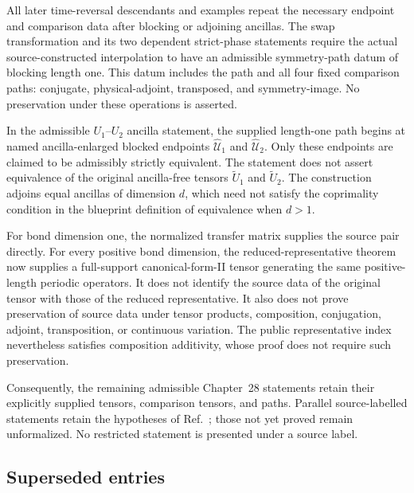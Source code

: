 \documentclass{article}
\begin{document}
All later time-reversal descendants and examples repeat the necessary endpoint
and comparison data after blocking or adjoining ancillas. The swap
transformation and its two dependent strict-phase statements require the
actual source-constructed interpolation to have an admissible symmetry-path
datum of blocking length one. This datum includes the path and all four fixed
comparison paths: conjugate, physical-adjoint, transposed, and symmetry-image.
No preservation under these operations is asserted.

In the admissible $U_1$--$U_2$ ancilla statement, the supplied length-one path
begins at named ancilla-enlarged blocked endpoints
$\widehat{\mathcal U}_1$ and $\widehat{\mathcal U}_2$. Only these endpoints are
claimed to be admissibly strictly equivalent. The statement does not assert
equivalence of the original ancilla-free tensors $\widetilde U_1$ and
$\widetilde U_2$. The construction adjoins equal ancillas of dimension $d$,
which need not satisfy the coprimality condition in the blueprint definition
of equivalence when $d>1$.

For bond dimension one, the normalized transfer matrix supplies the source pair
directly. For every positive bond dimension, the reduced-representative theorem
now supplies a full-support canonical-form-II tensor generating the same
positive-length periodic operators. It does not identify the source data of the
original tensor with those of the reduced representative. It also does not
prove preservation of source data under tensor products, composition,
conjugation, adjoint, transposition, or continuous variation. The public
representative index nevertheless satisfies composition additivity, whose
proof does not require such preservation.

Consequently, the remaining admissible Chapter~28 statements retain their
explicitly supplied tensors, comparison tensors, and paths. Parallel
source-labelled statements retain the hypotheses of Ref.~\cite{Cirac2017MPU};
those not yet proved remain unformalized. No restricted statement is presented
under a source label.

\subsection*{Superseded entries}
\end{document}
